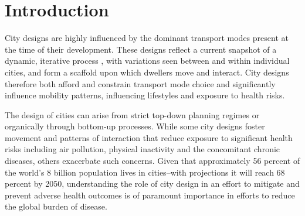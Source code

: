 \documentclass[preprint,12pt]{elsarticle}
\begin{document}
\begin{frontmatter}









\end{frontmatter}



\section*{Introduction}

City designs are highly influenced by the dominant transport modes present at the time of their development\cite{KNOWLES2020102607}. These designs reflect a current snapshot of a dynamic, iterative process \cite{Strano2012}, with variations seen between and within individual cities, and form a scaffold upon which dwellers move and interact\cite{Thompson2020}. City designs therefore both afford and constrain transport mode choice and significantly influence mobility patterns, influencing lifestyles and exposure to health risks\cite{WHO2023}.

The design of cities can arise from strict top-down planning regimes\cite{mundigo1977city} or organically through bottom-up processes\cite{batty2017thinking}. While some city designs foster movement and patterns of interaction that reduce exposure to significant health risks including air pollution, physical inactivity and the concomitant chronic diseases, others exacerbate such concerns\cite{Wijnands2022, Stevenson2016,wang2023flood, stanley2022managing}. Given that approximately 56 percent of the world's 8 billion population lives in cities--with projections it will reach 68 percent by 2050\cite{WHO2023}, understanding the role of city design in an effort to mitigate and prevent adverse health outcomes is of paramount importance in efforts to reduce the global burden of disease. 
\end{document}
